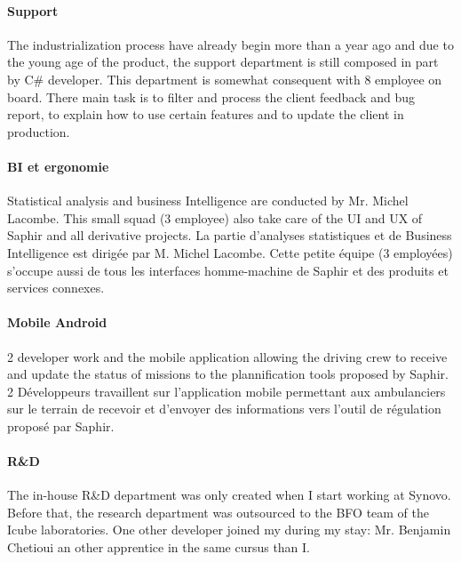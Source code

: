 \documentclass[12pt]{memoir}
\begin{document}
\paragraph{Support}\label{support}

The industrialization process have already begin more than a year ago and due to the young age of the product, the support department is still composed in part by C\# developer. This department is somewhat consequent with 8 employee on board. There main task is to filter and process the client feedback and bug report, to explain how to use certain features and to update the client in production. 


\paragraph{BI et ergonomie}\label{bi-et-ergonomie}

Statistical analysis and business Intelligence are conducted by Mr. Michel Lacombe. This small squad (3 employee) also take care of the UI and UX of Saphir and all derivative projects.
La partie d'analyses statistiques et de Business Intelligence est
dirigée par M. Michel Lacombe. Cette petite équipe (3 employées)
s'occupe aussi de tous les interfaces homme-machine de Saphir et des
produits et services connexes.

\paragraph{Mobile Android}\label{mobile-android}

2 developer work and the mobile application allowing the driving crew to receive and update the status of missions to the plannification tools proposed by Saphir.
2 Développeurs travaillent sur l'application mobile permettant aux
ambulanciers sur le terrain de recevoir et d'envoyer des informations
vers l'outil de régulation proposé par Saphir.

\paragraph{R\&D}\label{rd}

The in-house R\&D department was only created when I start working at Synovo.
Before that, the research department was outsourced to the BFO team of the Icube laboratories. 
One other developer joined my during my stay:  Mr. Benjamin Chetioui an other apprentice in the same cursus than I.


\label{sub:Synovo}
\end{document}
